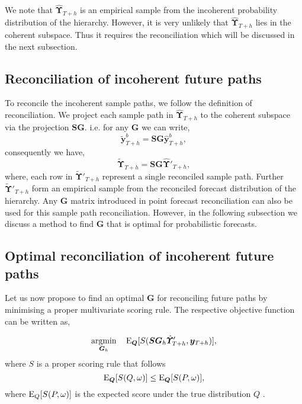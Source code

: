 We note that $\hat{\bm{\Upsilon}}_{T+h}$ is an empirical sample from the incoherent probability distribution of the hierarchy. However, it is very unlikely that $\hat{\bm{\Upsilon}}_{T+h}$ lies in the coherent subspace. Thus it requires the reconciliation which will be discussed in the next subsection. 

\subsection{Reconciliation of incoherent future paths}

To reconcile the incoherent sample paths, we follow the definition of reconciliation. We project each sample path in $\hat{\bm{\Upsilon}}_{T+h}$ to the coherent subspace via the projection $\bm{SG}$. i.e. for any $\bm{G}$ we can write, 
\begin{equation} \label{eq:sampleRecon_1}
\tilde{\bm{y}}_{T+h}^b = \bm{SG}\hat{\bm{y}}_{T+h}^b,
\end{equation} 
consequently we have, 
\begin{equation} \label{eq:sampleRecon_2}
\tilde{\bm{\Upsilon}}_{T+h} = \bm{SG}\hat{\bm{\Upsilon}}'_{T+h},
\end{equation} 
where, each row in $\tilde{\bm{\Upsilon}}'_{T+h}$ represent a single reconciled sample path. Further $\tilde{\bm{\Upsilon}}'_{T+h}$ form an empirical sample from the reconciled forecast distribution of the hierarchy. Any $\bm{G}$ matrix introduced in point forecast reconciliation can also be used for this sample path reconciliation. However, in the following subsection we discuss a method to find $\bm{G}$ that is optimal for probabilistic forecasts. 

\subsection{Optimal reconciliation of incoherent future paths}\label{subsec:Optimal_recon}
  
Let us now propose to find an optimal $\bm{G}$ for reconciling future paths by minimising a proper multivariate scoring rule. The respective objective function can be written as, 

\begin{equation} \label{eq:Obj_func_1}
\operatornamewithlimits{argmin}_{\bm{G}_h} \quad \E_{\bm{Q}}[S(\bm{SG}_h\hat{\bm{\Upsilon}}'_{T+h}, \bm{y}_{T+h})],
\end{equation}
where $S$ is a proper scoring rule that follows 
\begin{equation}\label{eq:prop_score}
\text{E}_{\bm{Q}}[S(Q,\omega)] \le \text{E}_{\bm{Q}}[S(P,\omega)] ,
\end{equation}
where $\text{E}_{Q}[S(P,\omega)]$ is the expected score under the true distribution $Q$ \citep{Gneiting2008, Gneiting2014}.

